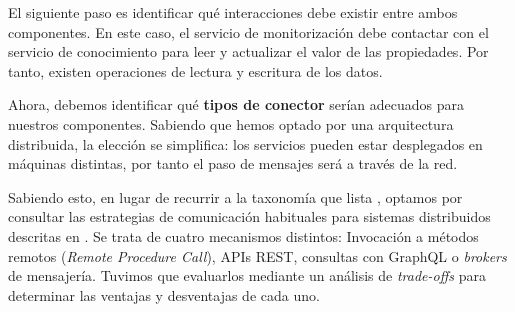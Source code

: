 El siguiente paso es identificar qué interacciones debe existir entre ambos componentes. En este caso, el servicio de monitorización debe contactar con el servicio de conocimiento para leer y actualizar el valor de las propiedades. Por tanto, existen operaciones de lectura y escritura de los datos.

Ahora, debemos identificar qué \textbf{tipos de conector} serían adecuados para nuestros componentes. Sabiendo que hemos optado por una arquitectura distribuida, la elección se simplifica: los servicios pueden estar desplegados en máquinas distintas, por tanto el paso de mensajes será a través de la red.

Sabiendo esto, en lugar de recurrir a la taxonomía que lista \cite{mehtaTaxonomySoftwareConnectors2000}, optamos por consultar las estrategias de comunicación habituales para sistemas distribuidos descritas en \cite{newmanBuildingMicroservicesDesigning2021}. Se trata de cuatro mecanismos distintos: Invocación a métodos remotos (\emph{Remote Procedure Call}), APIs REST, consultas con GraphQL o \emph{brokers} de mensajería. Tuvimos que evaluarlos mediante un análisis de \emph{trade-offs} para determinar las ventajas y desventajas de cada uno.

